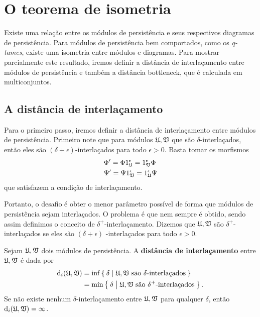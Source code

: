 \section{O teorema de isometria}

Existe uma relação entre os módulos de persistência e seus respectivos diagramas 
de persistência. Para módulos de persistência bem comportados, como os 
\textit{q-tames}, existe uma isometria entre módulos e diagramas. Para mostrar 
parcialmente este resultado, iremos definir a distância de interlaçamento entre
módulos de persistência e também a distância bottleneck, que é calculada
em multiconjuntos. 

\subsection{A distância de interlaçamento}

Para o primeiro passo, iremos definir a distância de interlaçamento entre
módulos de persistência. Primeiro note que para módulos 
$\mathfrak{U},  \mathfrak{V}$ que são $\delta$-interlaçados, então eles
são $(\delta+\epsilon)$-interlaçados para todo $\epsilon > 0$. Basta tomar
os morfismos
\begin{align*}
    & \Phi' = \Phi 1_{\mathfrak{U}}^\epsilon = 1_{\mathfrak{V}}^\epsilon \Phi \\
    & \Psi' = \Psi 1_{\mathfrak{V}}^\epsilon = 1_{\mathfrak{U}}^\epsilon \Psi
\end{align*}
que satisfazem a condição de interlaçamento. 

Portanto, o desafio é obter o menor parâmetro possível de forma que módulos
de persistência sejam interlaçados. O problema é que nem sempre é obtido, 
sendo assim definimos o conceito de $\delta^+$-interlaçamento. Dizemos que 
$\mathfrak{U}, \mathfrak{V}$ são $\delta^+$-interlaçados se eles são $(\delta + \epsilon)$
-interlaçados para todo $\epsilon > 0$. 

\begin{defi}
    Sejam $\mathfrak{U}, \mathfrak{V}$ dois módulos de persistência. A \textbf{distância
    de interlaçamento} entre $\mathfrak{U}, \mathfrak{V}$ é dada por
    \begin{align*}
        \text{d}_i(\mathfrak{U}, \mathfrak{V}) &= \inf\Set{\delta | \mathfrak{U}, \mathfrak{V}\text{ são }
        \delta \text{-interlaçados}} \\
        &=\min\Set{\delta | \mathfrak{U}, \mathfrak{V}\text{ são } \delta^+ 
        \text{-interlaçados}}.
    \end{align*}
    Se não existe nenhum $\delta$-interlaçamento entre $\mathfrak{U}, \mathfrak{V}$ para
    qualquer $\delta$, então $\text{d}_i(\mathfrak{U}, \mathfrak{V}) = \infty$.
\end{defi}


